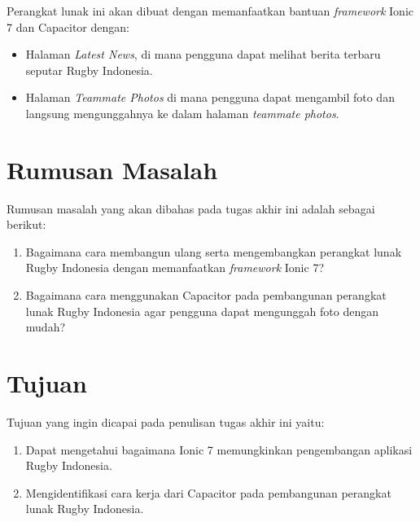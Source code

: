 Perangkat lunak ini akan dibuat dengan memanfaatkan bantuan {\it framework} Ionic 7 dan Capacitor dengan:

\begin{itemize}
    \item Halaman \textit{Latest News}, di mana pengguna dapat melihat berita terbaru seputar Rugby Indonesia.
    \item Halaman \textit{Teammate Photos} di mana pengguna dapat mengambil foto dan langsung mengunggahnya ke dalam halaman \textit{teammate photos}.
\end{itemize}



\section{Rumusan Masalah}
\label{sec:rumusan}
Rumusan masalah yang akan dibahas pada tugas akhir ini adalah sebagai berikut:
\begin{enumerate}
    \item Bagaimana cara membangun ulang serta mengembangkan perangkat lunak Rugby Indonesia dengan memanfaatkan \textit{framework} Ionic 7?
    \item Bagaimana cara menggunakan Capacitor pada pembangunan perangkat lunak Rugby Indonesia agar pengguna dapat mengunggah foto dengan mudah?
\end{enumerate}


\section{Tujuan}
\label{sec:tujuan}
Tujuan yang ingin dicapai pada penulisan tugas akhir ini yaitu:
\begin{enumerate}
    \item Dapat mengetahui bagaimana Ionic 7 memungkinkan pengembangan aplikasi Rugby Indonesia.
    \item Mengidentifikasi cara kerja dari Capacitor pada pembangunan perangkat lunak Rugby Indonesia.
\end{enumerate}

